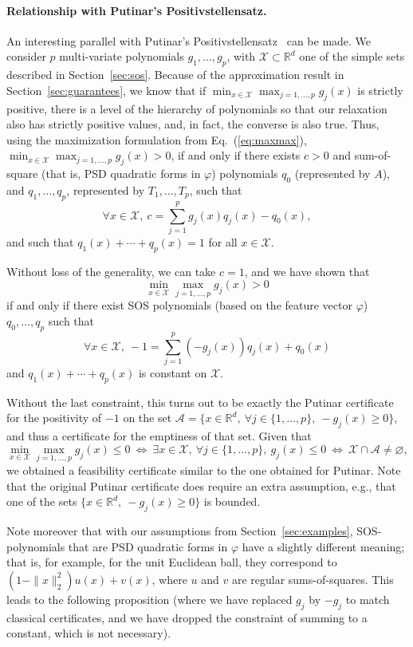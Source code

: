 \documentclass[11pt]{article}
\newcommand{\rb}{\mathbb{R}}
\newcommand{\mysec}[1]{Section~\ref{sec:#1}}
\newcommand{\eq}[1]{Eq.~(\ref{eq:#1})}
\def \X{{\mathcal X}}
\begin{document}
\paragraph{Relationship with Putinar's Positivstellensatz.} An interesting parallel with Putinar's Positivstellensatz~\cite{putinar1993positive} can be made. We consider $p$ multi-variate polynomials $g_1,\dots,g_p$, with $\X \subset \rb^d$   one of the simple sets described in \mysec{sos}. Because of the approximation result in \mysec{guarantees}, we know that if $\min_{x \in \X} \max_{j=1,\dots,p} g_j(x)$ is strictly positive, there is a level of the hierarchy of polynomials so that our relaxation also has strictly positive values, and, in fact, the converse is also true.
Thus, using the maximization formulation from \eq{maxmax}, $\min_{x \in \X} \max_{j=1,\dots,p} g_j(x) >0$,
if and only if there exists $c>0$ and sum-of-square (that is, PSD quadratic forms in $\varphi$) polynomials $q_0$ (represented by $A$), and $q_1,\dots,q_p$, represented by $T_1,\dots,T_p$, such that
\[
\forall x \in \X, \ 
c = \sum_{j=1}^p g_j(x) q_j(x) - q_0(x) ,
\]
and such that $q_1(x) + \cdots + q_p(x) = 1$ for all $x \in \X$.

Without loss of the generality, we can take $c=1$, and we have shown that 
\[
\min_{x \in \X} \max_{j=1,\dots,p} g_j(x) >0
\]
 if and only if there exist SOS polynomials (based on the feature vector $\varphi$) $q_0,\dots,q_p$ such that 
\[
\forall x \in \X, \ 
- 1 = \sum_{j=1}^p (-g_j(x)) q_j(x) + q_0(x)  
\]
and $q_1(x) + \cdots + q_p(x) $ is constant on $\X$.

Without the last constraint, this turns out  to be exactly the Putinar certificate for the positivity of $-1$ on the set 
$\mathcal{A} = \{x \in \rb^d, \ \forall j \in \{1,\dots,p\}, \ -g_j(x) \geqslant 0\}$, and thus a certificate for the emptiness of that set. Given that 
\[
\min_{x \in \X} \max_{j=1,\dots,p} g_j(x) \leqslant 0 
\ \Leftrightarrow\  \exists x \in \X, \ \forall j \in \{1,\dots,p\},\  g_j(x)\leqslant 0 \ \Leftrightarrow \
\X \cap \mathcal{A} \neq \varnothing,
\]
we obtained a feasibility certificate similar to the one obtained for Putinar. Note that the original Putinar certificate does require an extra assumption, e.g., that one of the sets 
$\{x \in \rb^d,\  - g_j(x) \geqslant 0\}$ is bounded.

Note moreover that with our assumptions from \mysec{examples}, SOS-polynomials that are PSD quadratic forms in $\varphi$ have a slightly different meaning; that is, for example, for the unit Euclidean ball, they correspond to $(1-\|x\|_2^2) u(x) + v(x)$, where $u$ and $v$ are regular sums-of-squares. This leads to the following proposition (where we have replaced $g_j$ by $-g_j$ to match classical certificates, and we have dropped the constraint of summing to a constant, which is not necessary).
\end{document}
